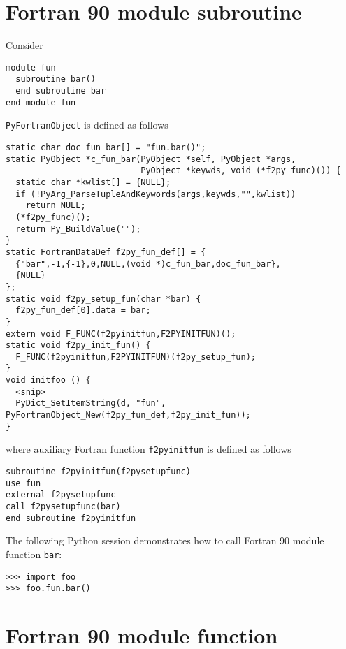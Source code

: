 \documentclass{article}
\begin{document}
\section{Fortran 90 module subroutine}
\label{sec:f90modsubrout}

Consider
\begin{verbatim}
module fun
  subroutine bar()
  end subroutine bar
end module fun
\end{verbatim}
\texttt{PyFortranObject} is defined as follows
\begin{verbatim}
static char doc_fun_bar[] = "fun.bar()";
static PyObject *c_fun_bar(PyObject *self, PyObject *args, 
                           PyObject *keywds, void (*f2py_func)()) {
  static char *kwlist[] = {NULL};
  if (!PyArg_ParseTupleAndKeywords(args,keywds,"",kwlist))
    return NULL;
  (*f2py_func)();
  return Py_BuildValue("");
}
static FortranDataDef f2py_fun_def[] = {
  {"bar",-1,{-1},0,NULL,(void *)c_fun_bar,doc_fun_bar},
  {NULL}
};
static void f2py_setup_fun(char *bar) {
  f2py_fun_def[0].data = bar;
}
extern void F_FUNC(f2pyinitfun,F2PYINITFUN)();
static void f2py_init_fun() {
  F_FUNC(f2pyinitfun,F2PYINITFUN)(f2py_setup_fun);
}
void initfoo () {
  <snip>
  PyDict_SetItemString(d, "fun", PyFortranObject_New(f2py_fun_def,f2py_init_fun));
}
\end{verbatim}
where auxiliary Fortran function \texttt{f2pyinitfun} is defined as
follows
\begin{verbatim}
subroutine f2pyinitfun(f2pysetupfunc)
use fun
external f2pysetupfunc
call f2pysetupfunc(bar)
end subroutine f2pyinitfun
\end{verbatim}
The following Python session demonstrates how to call Fortran 90
module function \texttt{bar}:
\begin{verbatim}
>>> import foo
>>> foo.fun.bar()
\end{verbatim}

\section{Fortran 90 module function}
\label{sec:f90modfunc}
\end{document}
